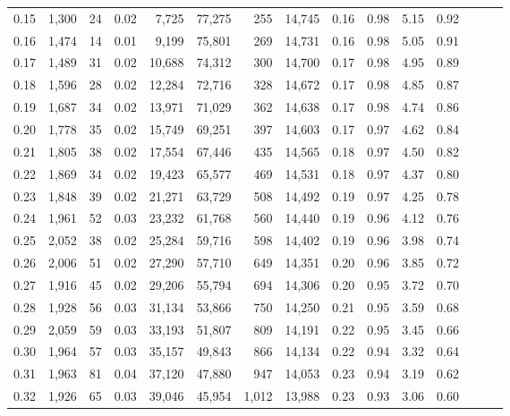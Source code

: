 \begin{tabular}{rrrrrrrrrrrrrrr}
0.15 &  1,300 &   24 &  0.02 &   7,725 &  77,275 &     255 &  14,745 &  0.16 &  0.98 &  5.15 &      0.92 \\
0.16 &  1,474 &   14 &  0.01 &   9,199 &  75,801 &     269 &  14,731 &  0.16 &  0.98 &  5.05 &      0.91 \\
0.17 &  1,489 &   31 &  0.02 &  10,688 &  74,312 &     300 &  14,700 &  0.17 &  0.98 &  4.95 &      0.89 \\
0.18 &  1,596 &   28 &  0.02 &  12,284 &  72,716 &     328 &  14,672 &  0.17 &  0.98 &  4.85 &      0.87 \\
0.19 &  1,687 &   34 &  0.02 &  13,971 &  71,029 &     362 &  14,638 &  0.17 &  0.98 &  4.74 &      0.86 \\
0.20 &  1,778 &   35 &  0.02 &  15,749 &  69,251 &     397 &  14,603 &  0.17 &  0.97 &  4.62 &      0.84 \\
0.21 &  1,805 &   38 &  0.02 &  17,554 &  67,446 &     435 &  14,565 &  0.18 &  0.97 &  4.50 &      0.82 \\
0.22 &  1,869 &   34 &  0.02 &  19,423 &  65,577 &     469 &  14,531 &  0.18 &  0.97 &  4.37 &      0.80 \\
0.23 &  1,848 &   39 &  0.02 &  21,271 &  63,729 &     508 &  14,492 &  0.19 &  0.97 &  4.25 &      0.78 \\
0.24 &  1,961 &   52 &  0.03 &  23,232 &  61,768 &     560 &  14,440 &  0.19 &  0.96 &  4.12 &      0.76 \\
0.25 &  2,052 &   38 &  0.02 &  25,284 &  59,716 &     598 &  14,402 &  0.19 &  0.96 &  3.98 &      0.74 \\
0.26 &  2,006 &   51 &  0.02 &  27,290 &  57,710 &     649 &  14,351 &  0.20 &  0.96 &  3.85 &      0.72 \\
0.27 &  1,916 &   45 &  0.02 &  29,206 &  55,794 &     694 &  14,306 &  0.20 &  0.95 &  3.72 &      0.70 \\
0.28 &  1,928 &   56 &  0.03 &  31,134 &  53,866 &     750 &  14,250 &  0.21 &  0.95 &  3.59 &      0.68 \\
0.29 &  2,059 &   59 &  0.03 &  33,193 &  51,807 &     809 &  14,191 &  0.22 &  0.95 &  3.45 &      0.66 \\
0.30 &  1,964 &   57 &  0.03 &  35,157 &  49,843 &     866 &  14,134 &  0.22 &  0.94 &  3.32 &      0.64 \\
0.31 &  1,963 &   81 &  0.04 &  37,120 &  47,880 &     947 &  14,053 &  0.23 &  0.94 &  3.19 &      0.62 \\
0.32 &  1,926 &   65 &  0.03 &  39,046 &  45,954 &   1,012 &  13,988 &  0.23 &  0.93 &  3.06 &      0.60 \\

\end{tabular}
